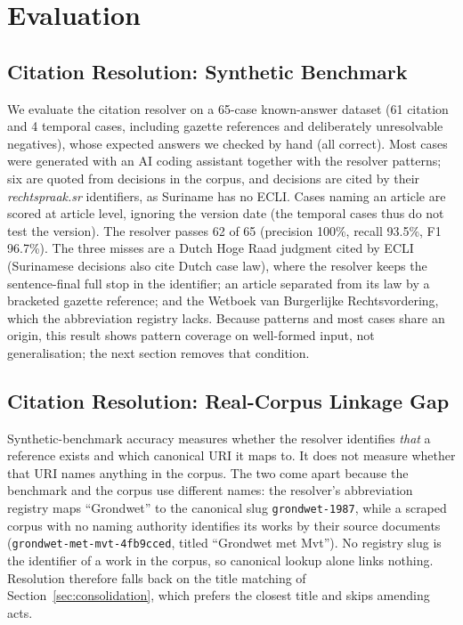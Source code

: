 \documentclass{IOS-Book-Article}
\begin{document}
\section{Evaluation}
\label{sec:eval}

\subsection{Citation Resolution: Synthetic Benchmark}
\label{sec:resolver-eval}

We evaluate the citation resolver on a 65-case known-answer dataset (61 citation and
4 temporal cases, including gazette references and deliberately unresolvable negatives),
whose expected answers we checked by hand (all correct). Most cases were generated with an AI coding assistant together
with the resolver patterns; six are quoted from decisions in the corpus, and decisions are
cited by their \emph{rechtspraak.sr} identifiers, as Suriname has no ECLI. Cases naming an
article are scored at article level, ignoring the version date (the temporal cases thus do
not test the version). The resolver passes 62 of 65 (precision 100\%, recall 93.5\%, F1
96.7\%). The three misses are a Dutch Hoge Raad judgment cited by ECLI (Surinamese
decisions also cite Dutch case law), where the resolver keeps the sentence-final full stop
in the identifier; an article separated from its law by a bracketed gazette reference; and
the Wetboek van Burgerlijke Rechtsvordering, which the abbreviation registry lacks. Because patterns and most cases share an
origin, this result
shows pattern coverage on well-formed input, not generalisation; the next section removes
that condition.

\subsection{Citation Resolution: Real-Corpus Linkage Gap}
\label{sec:linkage-gap}

Synthetic-benchmark accuracy measures whether the resolver identifies \emph{that} a
reference exists and which canonical URI it maps to. It does not measure whether that URI
names anything in the corpus. The two come apart because the benchmark and the corpus use
different names: the resolver's abbreviation registry maps ``Grondwet'' to the canonical
slug \texttt{grondwet-1987}, while a scraped corpus with no naming authority identifies its
works by their source documents (\texttt{grondwet-met-mvt-\allowbreak{}4fb9cced}, titled
``Grondwet met Mvt''). No registry slug is the identifier of a work in the corpus, so
canonical lookup alone links nothing. Resolution therefore falls back on the title matching
of Section~\ref{sec:consolidation}, which prefers the closest title and skips amending acts.
\end{document}
